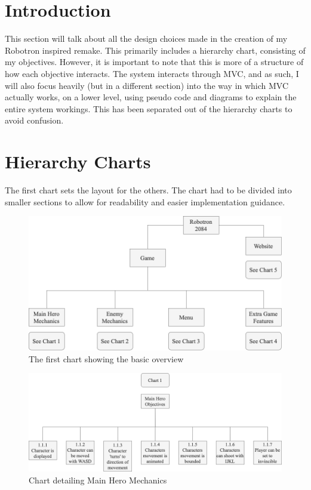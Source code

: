 \section{Introduction}
This section will talk about all the design choices made in the creation of my Robotron inspired remake. This primarily includes a hierarchy chart, consisting of my objectives. However, it is important to note that this is more of a structure of how each objective interacts. The system interacts through MVC, and as such, I will also focus heavily (but in a different section) into the way in which MVC actually works, on a lower level, using pseudo code and diagrams to explain the entire system workings. This has been separated out of the hierarchy charts to avoid confusion.

\section{Hierarchy Charts}
The first chart sets the layout for the others. The chart had to be divided into smaller sections to allow for readability and easier implementation guidance. 

\begin{figure}[H]
  \includegraphics[width=0.8\linewidth]{Figures/chart0.png}
  \centering
  \caption{The first chart showing the basic overview}
  \label{fig:Chart_0}
\end{figure}

\begin{figure}[H]
  \includegraphics[width=1\linewidth]{Figures/chart1.png}
  \centering
  \caption{Chart detailing Main Hero Mechanics}
  \label{fig:Chart_1}
\end{figure}

